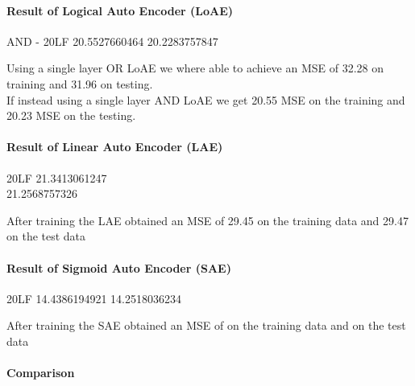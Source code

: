 \paragraph{Result of Logical Auto Encoder (LoAE)}
AND - 20LF
20.5527660464
20.2283757847


Using a single layer OR LoAE we where able to achieve an MSE of 32.28 on training and 31.96 on testing. \\

If instead using a single layer AND LoAE we get 20.55 MSE on the training and 20.23 MSE on the testing.\\

\paragraph{Result of Linear Auto Encoder (LAE)}
20LF
21.3413061247\\
21.2568757326

After training the LAE obtained an MSE of 29.45 on the training data and 29.47 on the test data

\paragraph{Result of Sigmoid Auto Encoder (SAE)}
20LF
14.4386194921
14.2518036234

After training the SAE obtained an MSE of  on the training data and  on the test data

\paragraph{Comparison}

